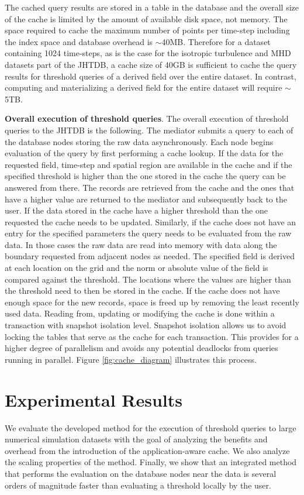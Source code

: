 \documentclass{sig-alternate}
\begin{document}
The cached query results are stored in a table in the database and the overall size of the cache is limited by the amount of available disk space, not memory.
The space required to cache the maximum number of points per time-step including the index space and database overhead is $\sim$40MB. 
Therefore for a dataset containing 
1024 time-steps, as is the case for the isotropic turbulence and MHD datasets part of the JHTDB, a cache size of 40GB is sufficient to cache the query
results for threshold queries of a derived field over the entire dataset. In contrast, computing and materializing a derived field for the entire dataset will
require $\sim$5TB.

{\bf Overall execution of threshold queries}. The overall execution of threshold queries to the JHTDB is the following. The mediator submits a query to each of the database nodes storing the raw data
asynchronously. Each node begins evaluation of the query by first performing a cache lookup. If the data for the requested field, time-step and spatial region
are available in the cache and if the specified threshold is higher than the one stored in the cache the query can be answered from there. The records are
retrieved from the cache and the ones that have a higher value are returned to the mediator and subsequently back to the user. If the data stored in the
cache have a higher threshold than the one requested the cache needs to be updated. Similarly, if the cache does not have an entry for the specified 
parameters the query needs to be evaluated from the raw data. In those cases the raw data are read into memory with data along the boundary requested from
adjacent nodes as needed. The specified field is derived at each location on the grid and the norm or absolute value of the field is compared against
the threshold. The locations where the values are higher than the threshold need to then be stored in the cache. If the cache does not have enough space
for the new records, space is freed up by removing the least recently used data.  Reading from, updating or modifying the cache is done within a
transaction with snapshot isolation level. Snapshot isolation allows us to avoid locking the tables that serve as the cache for each transaction. This
provides for a higher degree of parallelism and avoids any potential deadlocks from queries running in parallel. Figure \ref{fig:cache_diagram} illustrates 
this process.

\section{Experimental Results}
We evaluate the developed method for the execution of threshold queries to large numerical simulation datasets with the goal of analyzing the 
benefits and overhead from the introduction of the application-aware cache. We also analyze the scaling properties of the method. Finally, we show
that an integrated method that performs the evaluation on the database nodes near the data is several orders of magnitude faster than evaluating
a threshold locally by the user.
\end{document}
